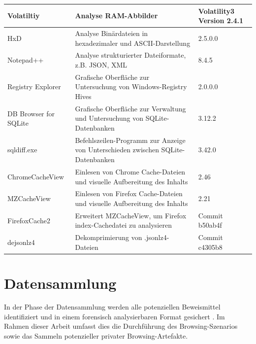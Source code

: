 \begin{table}[h!]
{\begin{tabular}{|l|l|l|}
Volatiltiy                              & Analyse RAM-Abbilder                                                             & Volatility3 Version 2.4.1             \\ \hline
HxD                                     & Analyse Binärdateien in hexadezimaler und ASCII-Darstellung                      & 2.5.0.0                               \\ \hline
Notepad++                               & Analyse strukturierter Dateiformate, z.B. JSON, XML                              & 8.4.5                                 \\ \hline
Registry Explorer                       & Grafische Oberfläche zur Untersuchung von Windows-Registry Hives                & 2.0.0.0                               \\ \hline
DB Browser for SQLite                   & Grafische Oberfläche zur Verwaltung und Untersuchung von SQLite-Datenbanken      & 3.12.2                                \\ \hline
sqldiff.exe                             & Befehlszeilen-Programm zur Anzeige von Unterschieden zwischen SQLite-Datenbanken & 3.42.0                                \\ \hline
ChromeCacheView                         & Einlesen von Chrome Cache-Dateien und visuelle Aufbereitung des Inhalts          & 2.46                                  \\ \hline
MZCacheView                             & Einlesen von Firefox Cache-Dateien und visuelle Aufbereitung des Inhalts         & 2.21                                  \\ \hline
FirefoxCache2                           & Erweitert MZCacheView, um Firefox \glqq{}index\grqq{}-Cachedatei zu analysieren              & Commit b50ab4f                        \\ \hline
dejsonlz4                               & Dekomprimierung von .jsonlz4-Dateien                                             & Commit c4305b8                        \\ \hline
\end{tabular}
}
\end{table}


\section{Datensammlung}
\label{section:methodik-datensammlung}
In der Phase der Datensammlung werden alle potenziellen Beweismittel identifiziert und in einem forensisch analysierbaren Format gesichert \cite{Izzati.2022}.
Im Rahmen dieser Arbeit umfasst dies die Durchführung des Browsing-Szenarios sowie das Sammeln potenzieller privater Browsing-Artefakte.

